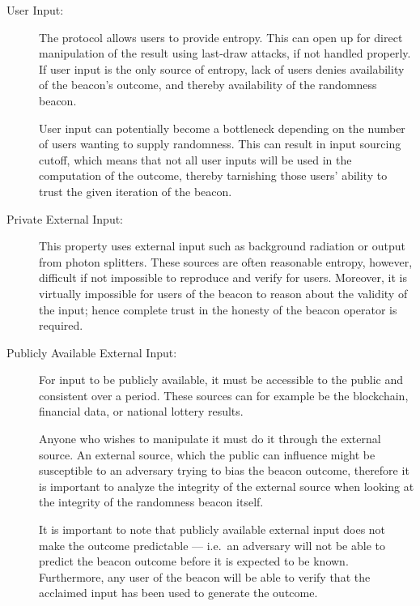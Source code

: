 \begin{description}
    \item[User Input:]
        The protocol allows users to provide entropy.
        This can open up for direct manipulation of the result using last-draw attacks, if not handled properly.
        If user input is the only source of entropy, lack of users denies availability of the beacon's outcome, and thereby availability of the randomness beacon.

        User input can potentially become a bottleneck depending on the number of users wanting to supply randomness.
        This can result in input sourcing cutoff, which means that not all user inputs will be used in the computation of the outcome, thereby tarnishing those users' ability to trust the given iteration of the beacon.

    \item[Private External Input:]
        This property uses external input such as background radiation or output from photon splitters.
        These sources are often reasonable entropy, however, difficult if not impossible to reproduce and verify for users.
        Moreover, it is virtually impossible for users of the beacon to reason about the validity of the input; hence complete trust in the honesty of the beacon operator is required.

    \item[Publicly Available External Input:]
        For input to be publicly available, it must be accessible to the public and consistent over a period.
        These sources can for example be the blockchain, financial data, or national lottery results.

        Anyone who wishes to manipulate it must do it through the external source.
        An external source, which the public can influence might be susceptible to an adversary trying to bias the beacon outcome, therefore it is important to analyze the integrity of the external source when looking at the integrity of the randomness beacon itself.

        It is important to note that publicly available external input does not make the outcome predictable --- i.e.\ an adversary will not be able to predict the beacon outcome before it is expected to be known. 
        Furthermore, any user of the beacon will be able to verify that the acclaimed input has been used to generate the outcome.

\end{description}

